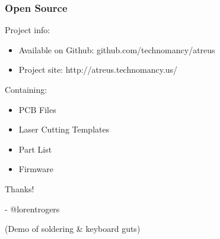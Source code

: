 \documentclass{beamer}
\begin{document}
\begin{frame}
  \frametitle{Open Source}
  Project info:
  \begin{itemize}
    \item Available on Github: github.com/technomancy/atreus
    \item Project site: http://atreus.technomancy.us/
  \end{itemize}
  Containing:
  \begin{itemize}
    \item PCB Files
    \item Laser Cutting Templates
    \item Part List
    \item Firmware
  \end{itemize}
\end{frame}

\begin{frame}
  Thanks!

  - @lorentrogers

  \tiny{(Demo of soldering \& keyboard guts)}
\end{frame}







\end{document}
